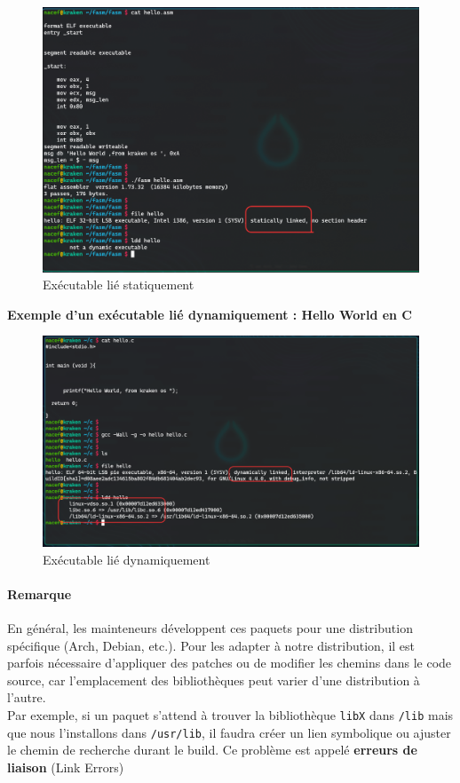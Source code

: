 \begin{figure}[H]
  \centering
  \includegraphics[width=1\textwidth]{images_pfe/staiclulinkedoff.png}
  \caption{Exécutable lié statiquement }
  \label{fig:staticsharedl}
\end{figure}
\clearpage

\textbf{Exemple d'un exécutable lié dynamiquement : Hello World en C }
\begin{figure}[H]
  \centering
  \includegraphics[width=1\textwidth]{images_pfe/dynamiclinkedoff.png}
  \caption{Exécutable lié dynamiquement }
  \label{fig:staticsharedl}
\end{figure}





\paragraph{Remarque}  
En général, les mainteneurs développent ces paquets pour une distribution spécifique (Arch, Debian, etc.). Pour les adapter à  notre distribution, il est parfois nécessaire d’appliquer des patches ou de modifier les chemins dans le code source, car l’emplacement des bibliothèques peut varier d’une distribution à l’autre.  \\
Par exemple, si un paquet s’attend à trouver la bibliothèque \texttt{libX} dans \texttt{/lib} mais que nous l’installons dans \texttt{/usr/lib}, il faudra créer un lien symbolique ou ajuster le chemin de recherche durant le build.  Ce problème est appelé \textbf{erreurs de liaison} (Link Errors)






